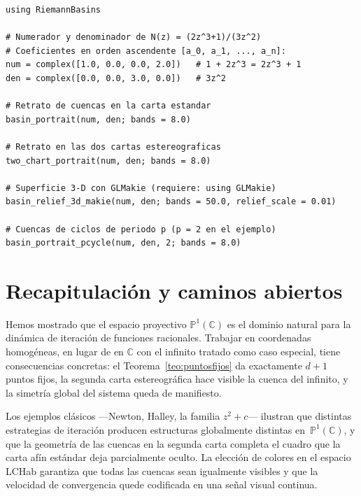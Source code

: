 \documentclass[11pt,a4paper]{article}
\theoremstyle{plain}
\theoremstyle{definition}
\theoremstyle{remark}
\newcommand{\C}{\mathbb{C}}
\newcommand{\Puno}{\mathbb{P}^1(\mathbb{C})}
\begin{document}
\begin{lstlisting}[caption={Retrato de cuencas para Newton en $z^3-1$ con visualización en las dos cartas de $\Puno$.}]
using RiemannBasins

# Numerador y denominador de N(z) = (2z^3+1)/(3z^2)
# Coeficientes en orden ascendente [a_0, a_1, ..., a_n]:
num = complex([1.0, 0.0, 0.0, 2.0])   # 1 + 2z^3 = 2z^3 + 1
den = complex([0.0, 0.0, 3.0, 0.0])   # 3z^2

# Retrato de cuencas en la carta estandar
basin_portrait(num, den; bands = 8.0)

# Retrato en las dos cartas estereograficas
two_chart_portrait(num, den; bands = 8.0)

# Superficie 3-D con GLMakie (requiere: using GLMakie)
basin_relief_3d_makie(num, den; bands = 50.0, relief_scale = 0.01)

# Cuencas de ciclos de periodo p (p = 2 en el ejemplo)
basin_portrait_pcycle(num, den, 2; bands = 8.0)
\end{lstlisting}


\section{Recapitulación y caminos abiertos}
\label{sec:conclusion}

Hemos mostrado que el espacio proyectivo $\Puno$ es el dominio natural
para la dinámica de iteración de funciones racionales.
Trabajar en coordenadas homogéneas, en lugar de en $\C$ con el infinito
tratado como caso especial, tiene consecuencias concretas: el
Teorema~\ref{teo:puntosfijos} da exactamente $d+1$ puntos fijos, la
segunda carta estereográfica hace visible la cuenca del infinito, y la
simetría global del sistema queda de manifiesto.

Los ejemplos clásicos —Newton, Halley, la familia $z^2+c$— ilustran
que distintas estrategias de iteración producen estructuras globalmente
distintas en~$\Puno$, y que la geometría de las cuencas en la segunda
carta completa el cuadro que la carta afín estándar deja parcialmente
oculto.
La elección de colores en el espacio LCHab garantiza que todas las
cuencas sean igualmente visibles y que la velocidad de convergencia
quede codificada en una señal visual continua.
\end{document}
